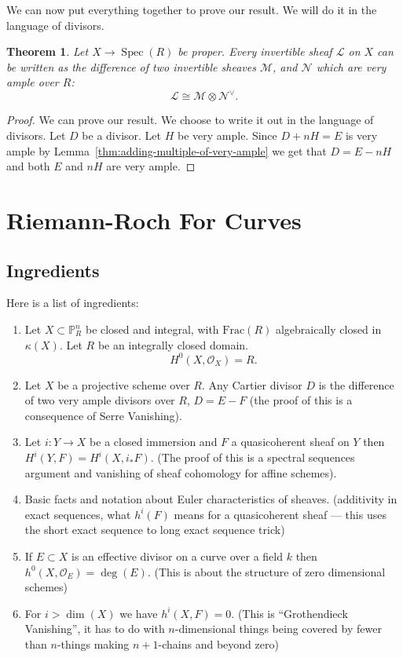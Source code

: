 \documentclass[12pt]{article}
\numberwithin{equation}{section}
\newtheorem{theorem}{Theorem}[subsection]
\theoremstyle{definition}
\theoremstyle{remark}
\newcommand{\Ocal}{\mathcal{O}}
\newcommand{\PP}{\mathbb{P}}
\newcommand{\Spec}{\operatorname{Spec}}
\newcommand{\Lcal}{\mathcal{L}}
\begin{document}
We can now put everything together to prove our result. We will do it in the language of divisors. 
\begin{theorem}
	Let $X \to \Spec(R)$ be proper. 
	Every invertible sheaf $\Lcal$ on $X$ can be written as the difference of two invertible sheaves $\mathcal{M}$, and $\mathcal{N}$ which are very ample over $R$:
	$$ \Lcal \cong \mathcal{M} \otimes \mathcal{N}^{\vee}.$$
\end{theorem}
\begin{proof}
	We can prove our result.
	We choose to write it out in the language of divisors.
	Let $D$ be a divisor. 
	Let $H$ be very ample. Since $D+nH=E$ is very ample by Lemma~\ref{thm:adding-multiple-of-very-ample} we get that $D = E-nH$ and both $E$ and $nH$ are very ample.
\end{proof}


\section{Riemann-Roch For Curves}
\subsection{Ingredients}
Here is a list of ingredients:
\begin{enumerate}
	\item Let $X \subset \PP^n_R$ be closed and integral, with $\mathrm{Frac}(R)$ algebraically closed in $\kappa(X)$. Let $R$ be an integrally closed domain. 
	 $$ H^0(X,\Ocal_X)= R.$$
	 \item Let $X$ be a projective scheme over $R$.
	 Any Cartier divisor $D$ is the difference of two very ample divisors over $R$, $D=E-F$ (the proof of this is a consequence of Serre Vanishing).
	 \item Let $i:Y\to X$ be a closed immersion and $F$ a quasicoherent sheaf on $Y$ then $H^i(Y,F) = H^i(X,i_*F)$. (The proof of this is a spectral sequences argument and vanishing of sheaf cohomology for affine schemes).
	 \item Basic facts and notation about Euler characteristics of sheaves. (additivity in exact sequences, what $h^i(F)$ means for a quasicoherent sheaf --- this uses the short exact sequence to long exact sequence trick)
	 \item If $E \subset X$ is an effective divisor on a curve over a field $k$ then $h^0(X,\Ocal_E)=\deg(E)$. (This is about the structure of zero dimensional schemes)
	 \item For $i>\dim(X)$ we have $h^i(X,F)=0$. (This is ``Grothendieck Vanishing'', it has to do with $n$-dimensional things being covered by fewer than $n$-things making $n+1$-chains and beyond zero)
\end{enumerate}
\end{document}
